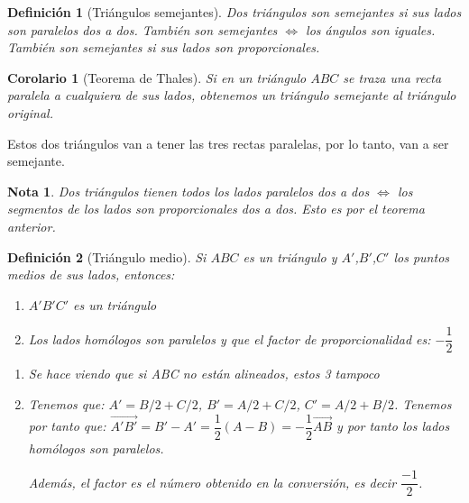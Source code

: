 \documentclass[11pt, a4paper, titlepage]{article}
\makeatletter
\renewenvironment{proof}[1][\proofname] {\vspace{-15pt}\par\pushQED{\qed}\normalfont\topsep6\p@\@plus6\p@\relax\trivlist\item[\hskip\labelsep\it#1\@addpunct{.}]\ignorespaces}{\popQED\endtrivlist\@endpefalse}
\renewcommand{\vec}{\overrightarrow}
\renewenvironment{proof}[1][\proofname] {\par\pushQED{\qed}\normalfont\topsep6\p@\@plus6\p@\relax\trivlist\item[\hskip\labelsep\itshape\sffamily#1\@addpunct{.}]\ignorespaces}{\popQED\endtrivlist\@endpefalse}
\theoremstyle{theorem-style}
\newtheorem{ncor}{Corolario}[section]
\theoremstyle{definition-style}
\newtheorem{ndef}{Definición}[section]
\theoremstyle{remark-style}
\newtheorem*{nota}{Nota}
\theoremstyle{example-style}
\newenvironment{nlist}
{\begin{enumerate}
    \renewcommand\labelenumi{(\emph{\roman{enumi})}}}
  {\end{enumerate}}
\makeatother
\begin{document}
\begin{ndef}[Triángulos semejantes]
  Dos triángulos son semejantes si sus lados son paralelos dos a dos. También son semejantes $\iff$ los ángulos son iguales. También son semejantes si sus lados son proporcionales.
\end{ndef}

\begin{ncor}[Teorema de Thales]
  Si en un triángulo $ABC$ se traza una recta paralela a cualquiera de sus lados, obtenemos un triángulo semejante al triángulo original.
\end{ncor}

\begin{proof}
	Estos dos triángulos van a tener las tres rectas paralelas, por lo tanto, van a ser semejante.
\end{proof}

\begin{nota}
  Dos triángulos tienen todos los lados paralelos dos a dos $\iff$ los segmentos de los lados son proporcionales dos a dos. Esto es por el teorema anterior.
\end{nota}

\begin{ndef}[Triángulo medio]
  Si $ABC$ es un triángulo y $A'$,$B'$,$C'$ los puntos medios de sus lados, entonces:
  \begin{nlist}
  \item $A'B'C'$ es un triángulo
  \item Los lados homólogos son paralelos y que el factor de proporcionalidad es: $-\dfrac{1}{2}$
  \end{nlist}\vspace{0.2cm}
  \begin{proof}

    \begin{nlist}
    \item Se hace viendo que si ABC no están alineados, estos 3 tampoco
    \item Tenemos que: $A' = B/2 + C/2$, $B' = A/2+C/2$, $C' = A/2 + B/2$. Tenemos por tanto que: $\vec{A'B'} = B'-A' = \dfrac{1}{2}(A-B) = -\dfrac{1}{2} \vec{AB}$ y por tanto los lados homólogos son paralelos.

      Además, el factor es el número obtenido en la conversión, es decir $\dfrac{-1}{2}$.
    \end{nlist}
  \end{proof}
\end{ndef}


\end{document}
